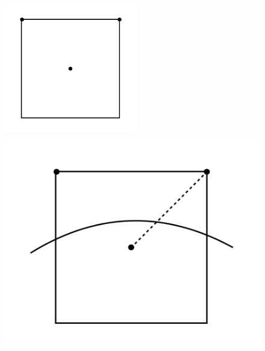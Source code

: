 \begin{figure}[!ht]
    \centering
    \begin{minipage}[b]{0.47\textwidth}
        \centering
        \includegraphics[width=5.8cm]{Images/chap3/1.png}
        \subcaption{}
    \end{minipage}
    \hfill
    \begin{minipage}[b]{0.47\textwidth}
        \centering
        \includegraphics[width=\textwidth]{Images/chap3/2.png}
        \subcaption{}
    \end{minipage}
    
    \vspace{1em} %


\end{figure}
